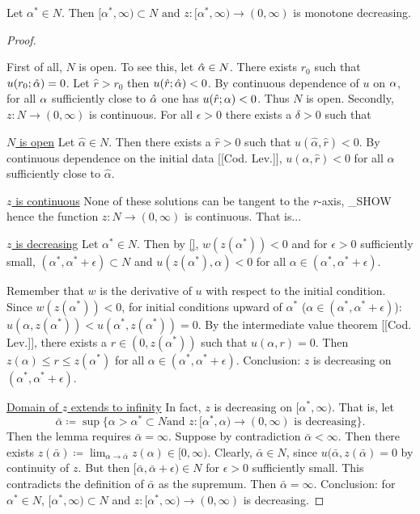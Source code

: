 
\begin{lemma}
  Let $\alpha^*\in N$.
  Then $[\alpha^*,\infty)\subset N\text{ and }z:[\alpha^*,\infty)\to(0,\infty)$ is monotone decreasing.
\begin{proof}
\begin{outline}
  \1 First of all, $N$ is open.
    \2 To see this, let $\hat{\alpha}\in N$.
    \2 There exists $r_0$ such that $u(r_0;\hat{\alpha})=0$.
    \2 Let $\hat r> r_0$ then $u(\hat r;\hat{\alpha})<0$.
    \2 By continuous dependence of $u$ on $\alpha$, for all $\alpha$ sufficiently close to $\hat{\alpha}$ one has $u(\hat r;\alpha)<0$.
    \2 Thus $N$ is open.
  \1 Secondly, $z:N\to(0,\infty)$ is continuous.
    \2 For all $\epsilon>0$ there exists a $\delta>0$ such that
\end{outline}

\seperate

\underline{$N$ is open}
Let $\hat\alpha\in N$.
Then there exists a $\hat r>0$ such that $u(\hat\alpha,\hat r)<0$.
By continuous dependence on the initial data [[Cod. Lev.]],
$u(\alpha,\hat r)<0$ for all $\alpha$ sufficiently close to $\hat\alpha$.

\underline{$z$ is continuous}
None of these solutions can be tangent to the $r$-axis, \_SHOW
hence the function $z:N\to(0,\infty)$ is continuous.
That is...

\seperate

\underline{$z$ is decreasing}
Let $\alpha^*\in N$.
Then by \ref{}, $w(z(\alpha^*))<0$ and for
$\epsilon>0$ sufficiently small,
$(\alpha^*,\alpha^*+\epsilon)\subset N$
and $u(z(\alpha^*),\alpha)<0$
for all $\alpha\in(\alpha^*,\alpha^*+\epsilon)$.

Remember that $w$ is the derivative of $u$ with respect to the initial condition.
Since $w(z(\alpha^*))<0$, for initial conditions upward of $\alpha^*$ ($\alpha\in(\alpha^*,\alpha^*+\epsilon)$):
$u(\alpha,z(\alpha^*))<u(\alpha^*,z(\alpha^*))=0$.
By the intermediate value theorem [[Cod. Lev.]], there exists a $r\in(0,z(\alpha^*))$ such that $u(\alpha,r)=0$.
Then $z(\alpha)\leq r\leq z(\alpha^*)$ for all $\alpha\in(\alpha^*,\alpha^*+\epsilon)$.
Conclusion: $z$ is decreasing on $(\alpha^*,\alpha^*+\epsilon)$.

\seperate

\underline{Domain of $z$ extends to infinity}
In fact, $z$ is decreasing on $[\alpha^*,\infty)$.
That is, let $$\bar\alpha\coloneqq\sup\{\alpha>\alpha^*\subset N\text{
and }z:[\alpha^*,\alpha)\to(0,\infty)\text{ is decreasing}\}.$$
Then the lemma requires $\bar\alpha=\infty$.
Suppose by contradiction $\bar\alpha<\infty$.
Then there exists $z(\bar\alpha)\coloneqq\lim_{\alpha\to\bar\alpha}z(\alpha)\in[0,\infty).$
Clearly, $\bar\alpha\in N$, since $u(\bar\alpha,z(\bar\alpha)=0$ by continuity of $z$.
But then $[\bar\alpha,\bar\alpha+\epsilon)\in N$ for $\epsilon>0$ sufficiently small.
This contradicts the definition of $\bar\alpha$ as the supremum.
Then $\bar\alpha=\infty$.
Conclusion: for $\alpha^*\in N$, $[\alpha^*,\infty)\subset N$
and $z:[\alpha^*,\infty)\to(0,\infty)$ is decreasing.

\end{proof}
\end{lemma}
